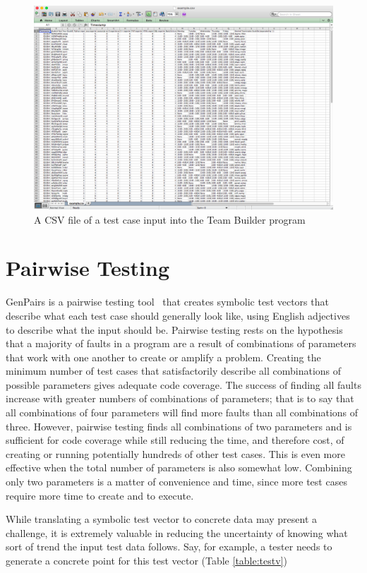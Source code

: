 \begin{figure}
\includegraphics[scale=0.3]{team-file.png}
\caption{A CSV file of a test case input into the Team Builder program}
\label{fig:teamfile}
\end{figure}

\section{Pairwise Testing}
GenPairs is a pairwise testing tool~\cite{Gen:Pairs} that creates symbolic test vectors that describe what each test case should generally look like, using English adjectives to describe what the input should be. Pairwise testing rests on the hypothesis that a majority of faults in a program are a result of combinations of parameters that work with one another to create or amplify a problem. Creating the minimum number of test cases that satisfactorily describe all combinations of possible parameters gives adequate code coverage. The success of finding all faults increase with greater numbers of combinations of parameters; that is to say that all combinations of four parameters will find more faults than all combinations of three. However, pairwise testing finds all combinations of two parameters and is sufficient for code coverage while still reducing the time, and therefore cost, of creating or running potentially hundreds of other test cases. This is even more effective when the total number of parameters is also somewhat low. Combining only two parameters is a matter of convenience and time, since more test cases require more time to create and to execute.

While translating a symbolic test vector to concrete data may present a challenge, it is extremely valuable in reducing the uncertainty of knowing what sort of trend the input test data follows. Say, for example, a tester needs to generate a concrete point for this test vector (Table \ref{table:testv})

